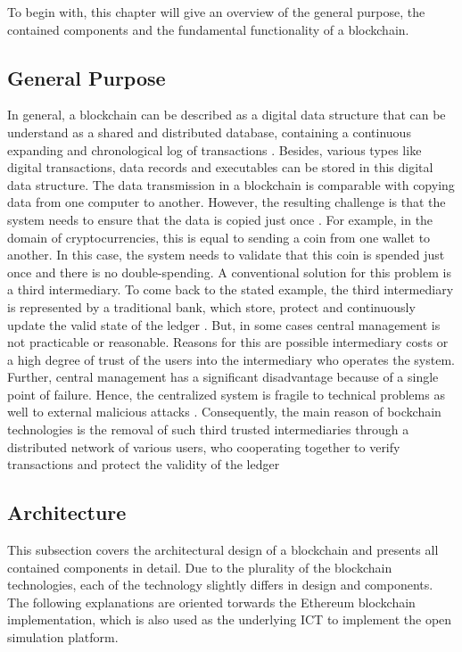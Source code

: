 To begin with, this chapter will give an overview of the general purpose, the contained components and the fundamental functionality of a blockchain. 

\subsection{General Purpose}
In general, a blockchain can be described as a digital data structure that can be understand as a shared and distributed database, containing a continuous expanding and chronological log of transactions \cite{andoni2019blockchain}. Besides, various types like digital transactions, data records and executables can be stored in this digital data structure. The data transmission in a blockchain is comparable with copying data from one computer to another. However, the resulting challenge is that the system needs to ensure that the data is copied just once \cite{andoni2019blockchain}. For example, in the domain of cryptocurrencies, this is equal to sending a coin from one wallet to another. In this case, the system needs to validate that this coin is spended just once and there is no double-spending. A conventional solution for this problem is a third intermediary. To come back to the stated example, the third intermediary is represented by a traditional bank, which store, protect and continuously update the valid state of the ledger \cite{andoni2019blockchain}. But, in some cases central management is not practicable or reasonable. Reasons for this are possible intermediary costs or a high degree of trust of the users into the intermediary who operates the system. Further, central management has a significant disadvantage because of a single point of failure. Hence, the centralized system is fragile to technical problems as well to external malicious attacks \cite{andoni2019blockchain}.
Consequently, the main reason of bockchain technologies is the removal of such third trusted intermediaries through a distributed network of various users, who cooperating together to verify transactions and protect the validity of the ledger

\subsection{Architecture}
This subsection covers the architectural design of a blockchain and presents all contained components in detail. Due to the plurality of the blockchain technologies, each of the technology slightly differs in design and components. The following explanations are oriented torwards the Ethereum blockchain implementation, which is also used as the underlying ICT to implement the open simulation platform.

